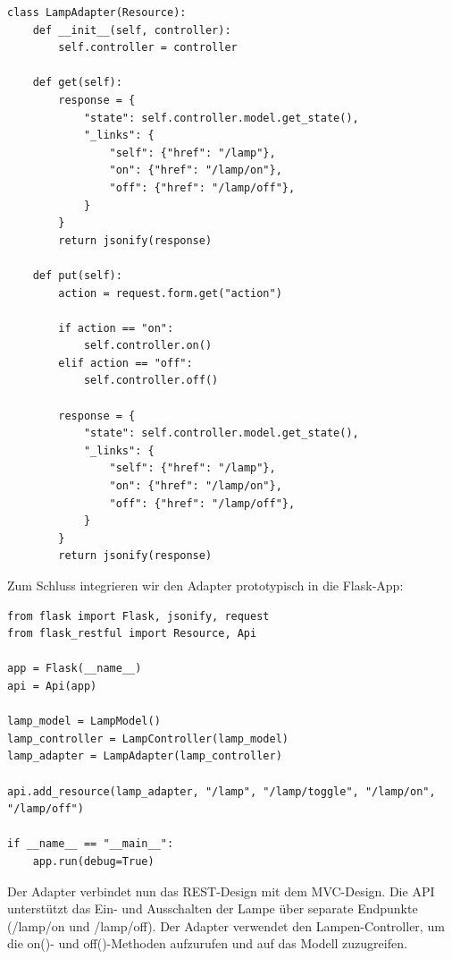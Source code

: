 \noindent\begin{minipage}{\textwidth}
\begin{lstlisting}[caption={LampController},captionpos=b,label={lst:lamp_c}]
class LampAdapter(Resource):
    def __init__(self, controller):
        self.controller = controller

    def get(self):
        response = {
            "state": self.controller.model.get_state(),
            "_links": {
                "self": {"href": "/lamp"},
                "on": {"href": "/lamp/on"},
                "off": {"href": "/lamp/off"},
            }
        }
        return jsonify(response)

    def put(self):
        action = request.form.get("action")

        if action == "on":
            self.controller.on()
        elif action == "off":
            self.controller.off()

        response = {
            "state": self.controller.model.get_state(),
            "_links": {
                "self": {"href": "/lamp"},
                "on": {"href": "/lamp/on"},
                "off": {"href": "/lamp/off"},
            }
        }
        return jsonify(response)
\end{lstlisting}
\end{minipage}
Zum Schluss integrieren wir den Adapter prototypisch in die Flask-App:\\
\noindent\begin{minipage}{\textwidth}
\begin{lstlisting}[caption={Lamp REST APP},captionpos=b,label={lst:lamp_r}]
from flask import Flask, jsonify, request
from flask_restful import Resource, Api

app = Flask(__name__)
api = Api(app)

lamp_model = LampModel()
lamp_controller = LampController(lamp_model)
lamp_adapter = LampAdapter(lamp_controller)

api.add_resource(lamp_adapter, "/lamp", "/lamp/toggle", "/lamp/on", "/lamp/off")

if __name__ == "__main__":
    app.run(debug=True)
\end{lstlisting}
\end{minipage}

Der Adapter verbindet nun das REST-Design mit dem MVC-Design. Die API unterstützt das Ein- und Ausschalten der Lampe über separate Endpunkte (/lamp/on und /lamp/off). Der Adapter verwendet den Lampen-Controller, um die on()- und off()-Methoden aufzurufen und auf das Modell zuzugreifen.

